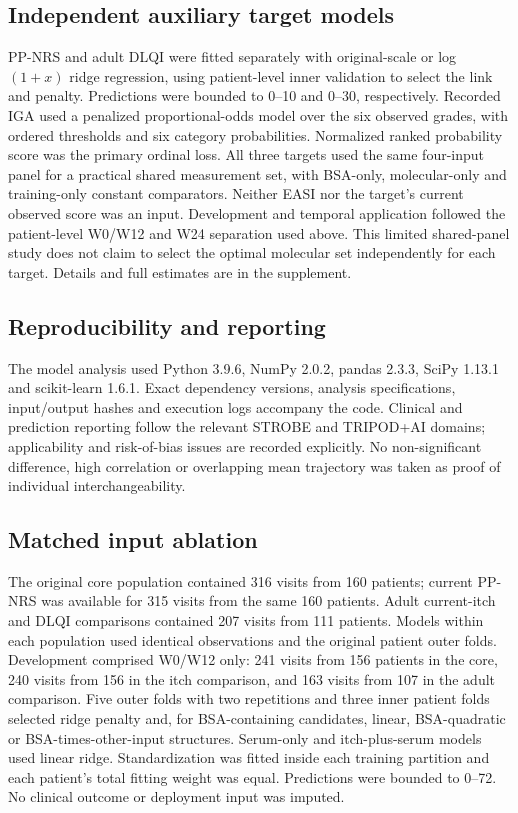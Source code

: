 \documentclass[10pt,a4paper]{article}
\begin{document}
\subsection{Independent auxiliary target models}
PP-NRS and adult DLQI were fitted separately with original-scale or log$(1+x)$ ridge regression, using patient-level inner validation to select the link and penalty. Predictions were bounded to 0--10 and 0--30, respectively. Recorded IGA used a penalized proportional-odds model over the six observed grades, with ordered thresholds and six category probabilities. Normalized ranked probability score was the primary ordinal loss. All three targets used the same four-input panel for a practical shared measurement set, with BSA-only, molecular-only and training-only constant comparators. Neither EASI nor the target's current observed score was an input. Development and temporal application followed the patient-level W0/W12 and W24 separation used above. This limited shared-panel study does not claim to select the optimal molecular set independently for each target. Details and full estimates are in the supplement.

\subsection{Reproducibility and reporting}
The model analysis used Python 3.9.6, NumPy 2.0.2, pandas 2.3.3, SciPy 1.13.1 and scikit-learn 1.6.1. Exact dependency versions, analysis specifications, input/output hashes and execution logs accompany the code. Clinical and prediction reporting follow the relevant STROBE and TRIPOD+AI domains; applicability and risk-of-bias issues are recorded explicitly.\citep{vonelm2007strobe,collins2024tripod,moons2025probast} No non-significant difference, high correlation or overlapping mean trajectory was taken as proof of individual interchangeability.

\subsection*{Matched input ablation}
The original core population contained 316 visits from 160 patients; current PP-NRS was available for 315 visits from the same 160 patients. Adult current-itch and DLQI comparisons contained 207 visits from 111 patients. Models within each population used identical observations and the original patient outer folds. Development comprised W0/W12 only: 241 visits from 156 patients in the core, 240 visits from 156 in the itch comparison, and 163 visits from 107 in the adult comparison. Five outer folds with two repetitions and three inner patient folds selected ridge penalty and, for BSA-containing candidates, linear, BSA-quadratic or BSA-times-other-input structures. Serum-only and itch-plus-serum models used linear ridge. Standardization was fitted inside each training partition and each patient's total fitting weight was equal. Predictions were bounded to 0--72. No clinical outcome or deployment input was imputed.
\end{document}
